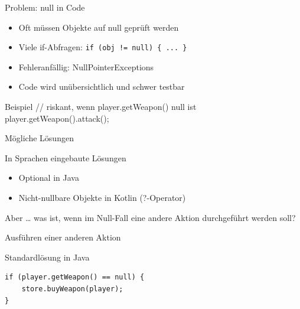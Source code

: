 \begin{frame}{Problem: null in Code}
    \begin{itemize}
        \item Oft müssen Objekte auf null geprüft werden
        \item Viele if-Abfragen: \texttt{if (obj != null) \{ ... \}}
        \item Fehleranfällig: NullPointerExceptions
        \item Code wird unübersichtlich und schwer testbar
    \end{itemize}
    \pause
    \begin{alertblock}{Beispiel}
    	// riskant, wenn player.getWeapon() null ist
        player.getWeapon().attack(); 
    \end{alertblock}
\end{frame}

\begin{frame}{Mögliche Lösungen}
	\begin{block}{In Sprachen eingebaute Lösungen}
	    \begin{itemize}
	        \item Optional in Java
	        \item Nicht-nullbare Objekte in Kotlin (?-Operator)
	    \end{itemize}
    \end{block}
    \pause
    \begin{alertblock}{Aber \ldots}
   		was ist, wenn im Null-Fall eine andere Aktion durchgeführt werden soll?
    \end{alertblock}
\end{frame}

\begin{frame}[fragile]{Ausführen einer anderen Aktion}
	\begin{exampleblock}{Standardlösung in Java}
		\begin{lstlisting}
if (player.getWeapon() == null) {
	store.buyWeapon(player);
}		
		\end{lstlisting}
	\end{exampleblock}
\end{frame}